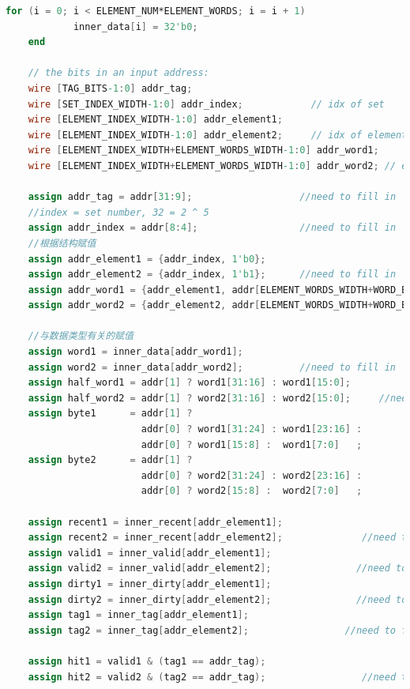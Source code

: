\begin{lstlisting}[language = {verilog}]
        for (i = 0; i < ELEMENT_NUM*ELEMENT_WORDS; i = i + 1)
            inner_data[i] = 32'b0;
    end

    // the bits in an input address:
    wire [TAG_BITS-1:0] addr_tag;
    wire [SET_INDEX_WIDTH-1:0] addr_index;            // idx of set
    wire [ELEMENT_INDEX_WIDTH-1:0] addr_element1; 
    wire [ELEMENT_INDEX_WIDTH-1:0] addr_element2;     // idx of element
    wire [ELEMENT_INDEX_WIDTH+ELEMENT_WORDS_WIDTH-1:0] addr_word1;
    wire [ELEMENT_INDEX_WIDTH+ELEMENT_WORDS_WIDTH-1:0] addr_word2; // element index + word index

    assign addr_tag = addr[31:9];                   //need to fill in
    //index = set number, 32 = 2 ^ 5
    assign addr_index = addr[8:4];                  //need to fill in
    //根据结构赋值
    assign addr_element1 = {addr_index, 1'b0};
    assign addr_element2 = {addr_index, 1'b1};      //need to fill in
    assign addr_word1 = {addr_element1, addr[ELEMENT_WORDS_WIDTH+WORD_BYTES_WIDTH-1:WORD_BYTES_WIDTH]};
    assign addr_word2 = {addr_element2, addr[ELEMENT_WORDS_WIDTH+WORD_BYTES_WIDTH-1:WORD_BYTES_WIDTH]};           //need to fill in

    //与数据类型有关的赋值
    assign word1 = inner_data[addr_word1];
    assign word2 = inner_data[addr_word2];          //need to fill in
    assign half_word1 = addr[1] ? word1[31:16] : word1[15:0];
    assign half_word2 = addr[1] ? word2[31:16] : word2[15:0];     //need to fill in
    assign byte1      = addr[1] ?
                        addr[0] ? word1[31:24] : word1[23:16] :
                        addr[0] ? word1[15:8] :  word1[7:0]   ;
    assign byte2      = addr[1] ?
                        addr[0] ? word2[31:24] : word2[23:16] :
                        addr[0] ? word2[15:8] :  word2[7:0]   ;               //need to fill in

    assign recent1 = inner_recent[addr_element1];
    assign recent2 = inner_recent[addr_element2];              //need to fill in
    assign valid1 = inner_valid[addr_element1];
    assign valid2 = inner_valid[addr_element2];               //need to fill in
    assign dirty1 = inner_dirty[addr_element1];
    assign dirty2 = inner_dirty[addr_element2];               //need to fill in
    assign tag1 = inner_tag[addr_element1];
    assign tag2 = inner_tag[addr_element2];                 //need to fill in

    assign hit1 = valid1 & (tag1 == addr_tag);
    assign hit2 = valid2 & (tag2 == addr_tag);                 //need to fill in


\end{lstlisting}
